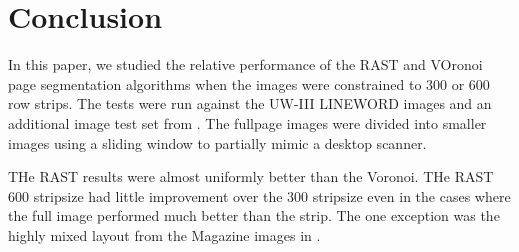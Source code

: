 \documentclass[conference]{IEEEtran}
\begin{document}
%





\section{Conclusion}

In this paper, we studied the relative performance of the RAST and VOronoi page
segmentation algorithms when the images were constrained to 300 or 600 row
strips. The tests were run against the UW-III LINEWORD images and an additional
image test set from \cite{IEEEhowto:Winder}. The fullpage images were divided
into smaller images using a sliding window to partially mimic a desktop
scanner.

THe RAST results were almost uniformly better than the Voronoi. THe RAST 600
stripsize had little improvement over the 300 stripsize even in the cases where
the full image performed much better than the strip. The one exception was the
highly mixed layout from the Magazine images in \cite{IEEEhowto:Winder}.
\end{document}
